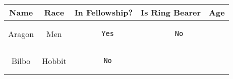 \documentclass[
]{article}
\begin{document}
\begin{longtable}[]{@{}ccccc@{}}
\toprule
\begin{minipage}[b]{0.13\columnwidth}\centering
Name\strut
\end{minipage} & \begin{minipage}[b]{0.13\columnwidth}\centering
Race\strut
\end{minipage} & \begin{minipage}[b]{0.21\columnwidth}\centering
In Fellowship?\strut
\end{minipage} & \begin{minipage}[b]{0.21\columnwidth}\centering
Is Ring Bearer\strut
\end{minipage} & \begin{minipage}[b]{0.12\columnwidth}\centering
Age\strut
\end{minipage}\tabularnewline
\midrule
\endhead
\begin{minipage}[t]{0.13\columnwidth}\centering
Aragon\strut
\end{minipage} & \begin{minipage}[t]{0.13\columnwidth}\centering
Men\strut
\end{minipage} & \begin{minipage}[t]{0.21\columnwidth}\centering
\begin{verbatim}
  Yes
\end{verbatim}
\strut
\end{minipage} & \begin{minipage}[t]{0.21\columnwidth}\centering
\begin{verbatim}
    No
\end{verbatim}
\strut
\end{minipage} & \begin{minipage}[t]{0.12\columnwidth}\centering
88\strut
\end{minipage}\tabularnewline
\begin{minipage}[t]{0.13\columnwidth}\centering
Bilbo\strut
\end{minipage} & \begin{minipage}[t]{0.13\columnwidth}\centering
Hobbit\strut
\end{minipage} & \begin{minipage}[t]{0.21\columnwidth}\centering
\begin{verbatim}
  No
\end{verbatim}
\strut
\end{minipage} & \begin{minipage}[t]{0.21\columnwidth}\centering

\end{minipage}
\end{longtable}
\end{document}
